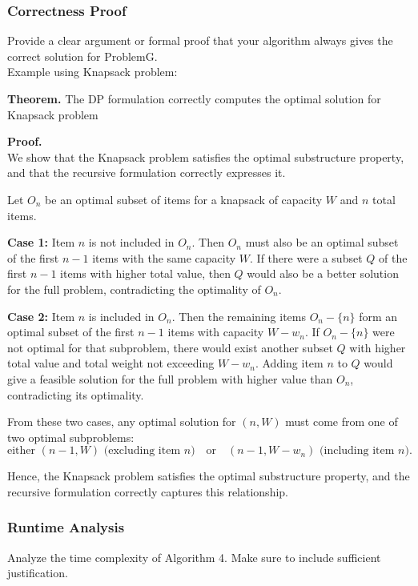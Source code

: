 \documentclass{article}
\begin{document}
\subsubsection{Correctness Proof}

{\color{red} Provide a clear argument or formal proof that your algorithm always gives the correct solution for ProblemG.\\

Example using Knapsack problem:\\  
}

\noindent\textbf{Theorem.}  
The DP formulation correctly computes the optimal solution for Knapsack problem

\noindent\textbf{Proof.}\\

We show that the Knapsack problem satisfies the optimal substructure property,  
and that the recursive formulation correctly expresses it.

Let $O_n$ be an optimal subset of items for a knapsack of capacity $W$ and $n$ total items.

\textbf{Case 1:} Item $n$ is not included in $O_n$.  
Then $O_n$ must also be an optimal subset of the first $n-1$ items with the same capacity $W$.  
If there were a subset $Q$ of the first $n-1$ items with higher total value,  
then $Q$ would also be a better solution for the full problem, contradicting the optimality of $O_n$.

\textbf{Case 2:} Item $n$ is included in $O_n$.  
Then the remaining items $O_n - \{n\}$ form an optimal subset of the first $n-1$ items  
with capacity $W - w_n$.  
If $O_n - \{n\}$ were not optimal for that subproblem,  
there would exist another subset $Q$ with higher total value and total weight not exceeding $W - w_n$.  
Adding item $n$ to $Q$ would give a feasible solution for the full problem with higher value than $O_n$,  
contradicting its optimality.

From these two cases, any optimal solution for $(n, W)$ must come from one of two optimal subproblems:
\[
\text{either } (n-1, W) \text{ (excluding item $n$)} \quad \text{or} \quad (n-1, W - w_n) \text{ (including item $n$)}.
\]

Hence, the Knapsack problem satisfies the optimal substructure property,  
and the recursive formulation correctly captures this relationship.



\subsubsection{Runtime Analysis}
{\color{red} Analyze the time complexity of Algorithm 4. Make sure to include sufficient
justification.}
\end{document}
